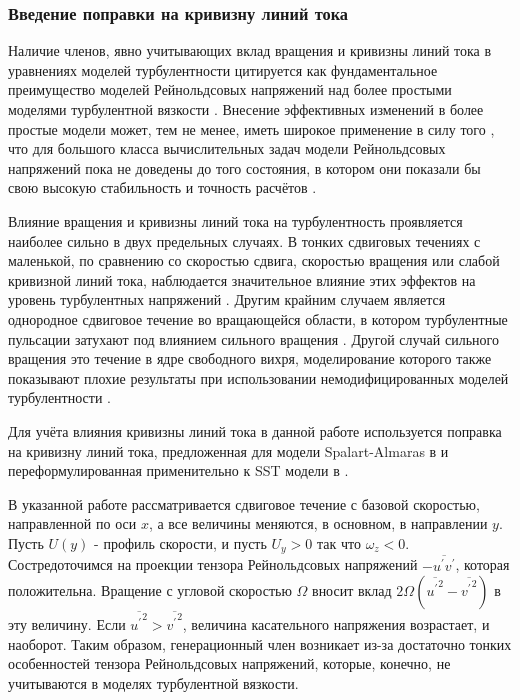 	\subsubsection{Введение поправки на кривизну линий тока}
		\label{CC}
		Наличие членов, явно учитывающих вклад вращения и кривизны линий тока в уравнениях моделей турбулентности цитируется как фундаментальное преимущество моделей Рейнольдсовых напряжений над более простыми моделями турбулентной вязкости \cite{ShurSpallart}. Внесение эффективных изменений в более простые модели может, тем не менее, иметь широкое применение в силу того \cite{CC2}, что для большого класса вычислительных задач модели Рейнольдсовых напряжений пока не доведены до того состояния, в котором они показали бы свою высокую стабильность и точность расчётов \cite{CC3}.
		
		Влияние вращения и кривизны линий тока на турбулентность проявляется наиболее сильно в двух предельных случаях. В тонких сдвиговых течениях с маленькой, по сравнению со скоростью сдвига, скоростью вращения или слабой кривизной линий тока, наблюдается значительное влияние этих эффектов на уровень турбулентных напряжений \cite{Bradshaw}. Другим крайним случаем является однородное сдвиговое течение во вращающейся области, в котором турбулентные пульсации затухают под влиянием сильного вращения \cite{Speziale}. Другой случай сильного вращения это течение в ядре свободного вихря, моделирование которого также показывают плохие результаты при использовании немодифицированных моделей турбулентности \cite{Govindaraju}.
		
		Для учёта влияния кривизны линий тока в данной работе используется поправка на кривизну линий тока, предложенная для модели Spalart-Almaras в \cite{ShurSpallart} и переформулированная применительно к SST модели в \cite{Smirnov}.
		
		В указанной работе рассматривается сдвиговое течение с базовой скоростью, направленной по оси $x$, а все величины меняются, в основном, в направлении $y$. Пусть $U(y)$ - профиль скорости, и пусть $U_y > 0$ так что $\omega_z < 0$. Состредоточимся на проекции тензора Рейнольдсовых напряжений $-\overline{u^{'}v^{'}}$, которая положительна. Вращение с угловой скоростью $\Omega$ вносит вклад $2\Omega(\overline{{u^{'}}^2}-\overline{{v^{'}}^2})$ в эту величину. Если $\overline{{u^{'}}^2} > \overline{{v^{'}}^2}$, величина касательного напряжения возрастает, и наоборот. Таким образом, генерационный член возникает из-за достаточно тонких особенностей тензора Рейнольдсовых напряжений, которые, конечно, не учитываются в моделях турбулентной вязкости.
		
